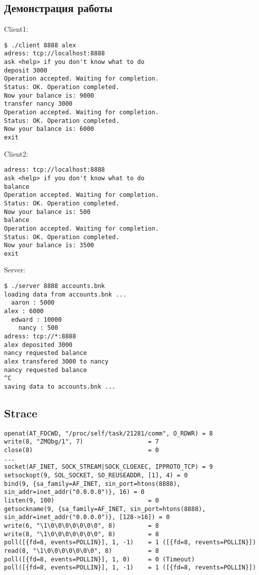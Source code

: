 \documentclass[12pt]{article}
\begin{document}
\subsection*{Демонстрация работы}



Client1:
\begin{lstlisting}
$ ./client 8888 alex
adress: tcp://localhost:8888
ask <help> if you don't know what to do
deposit 3000
Operation accepted. Waiting for completion.
Status: OK. Operation completed.
Now your balance is: 9000
transfer nancy 3000
Operation accepted. Waiting for completion.
Status: OK. Operation completed.
Now your balance is: 6000
exit
\end{lstlisting}

Client2:
\begin{lstlisting}
adress: tcp://localhost:8888
ask <help> if you don't know what to do
balance
Operation accepted. Waiting for completion.
Status: OK. Operation completed.
Now your balance is: 500
balance
Operation accepted. Waiting for completion.
Status: OK. Operation completed.
Now your balance is: 3500
exit
\end{lstlisting}
Server:

\begin{lstlisting}
$ ./server 8888 accounts.bnk 
loading data from accounts.bnk ...
  aaron : 5000 
alex : 6000 
  edward : 10000 
    nancy : 500 
adress: tcp://*:8888
alex deposited 3000
nancy requested balance
alex transfered 3000 to nancy
nancy requested balance
^C
saving data to accounts.bnk ...
\end{lstlisting}

\subsection*{Strace}
\begin{verbatim}
openat(AT_FDCWD, "/proc/self/task/21281/comm", O_RDWR) = 8
write(8, "ZMQbg/1", 7)                  = 7
close(8)                                = 0
...
socket(AF_INET, SOCK_STREAM|SOCK_CLOEXEC, IPPROTO_TCP) = 9
setsockopt(9, SOL_SOCKET, SO_REUSEADDR, [1], 4) = 0
bind(9, {sa_family=AF_INET, sin_port=htons(8888),
sin_addr=inet_addr("0.0.0.0")}, 16) = 0
listen(9, 100)                          = 0
getsockname(9, {sa_family=AF_INET, sin_port=htons(8888),
sin_addr=inet_addr("0.0.0.0")}, [128->16]) = 0
write(6, "\1\0\0\0\0\0\0\0", 8)         = 8
write(8, "\1\0\0\0\0\0\0\0", 8)         = 8
poll([{fd=8, events=POLLIN}], 1, -1)    = 1 ([{fd=8, revents=POLLIN}])
read(8, "\1\0\0\0\0\0\0\0", 8)          = 8
poll([{fd=8, events=POLLIN}], 1, 0)     = 0 (Timeout)
poll([{fd=8, events=POLLIN}], 1, -1)    = 1 ([{fd=8, revents=POLLIN}])
\end{verbatim}
\end{document}
